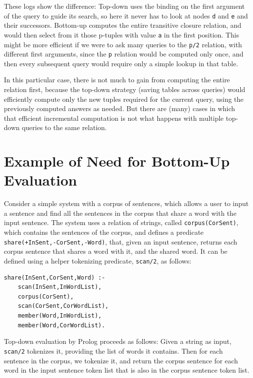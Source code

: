 These logs show the difference: Top-down uses the binding on the first
argument of the query to guide its search, so here it never
has to look at nodes {\tt d} and {\tt e} and their successors.
Bottom-up computes the entire transitive closure relation, and would
then select from it those p-tuples with value {\tt a}
in the first position.  This might be more efficient if we were to ask
many queries to the {\tt p/2} relation, with different first
arguments, since the {\tt p} relation would be computed only once, and
then every subsequent query would require only a simple lookup in that
table.

In this particular case, there is not much to gain from computing the
entire relation first, because the top-down strategy (saving tables
across queries) would efficiently compute only the new tuples required
for the current query, using the previously computed answers as
needed.  But there are (many) cases in which that efficient
incremental computation is not what happens with multiple top-down
queries to the same relation.

\section{Example of Need for Bottom-Up Evaluation}

\begin{example} \label{corpus}
Consider a simple system with a corpus of sentences,
which allows a user to input a sentence and find all the sentences in
the corpus that share a word with the input sentence.  The system uses
a relation of strings, called {\tt corpus(CorSent)}, which contains
the sentences of the corpus, and defines a predicate {\tt
  share(+InSent,-CorSent,-Word)}, that, given an input sentence,
returns each corpus sentence that shares a word with it, and the shared
word.  It can be defined using a helper tokenizing
predicate, {\tt scan/2}, as follows:

\footnotesize
\begin{verbatim}
share(InSent,CorSent,Word) :-
    scan(InSent,InWordList),
    corpus(CorSent),
    scan(CorSent,CorWordList),
    member(Word,InWordList),
    member(Word,CorWordList).
\end{verbatim}
\normalsize

Top-down evaluation by Prolog proceeds as follows:
Given a string as input, {\tt scan/2} tokenizes it,
providing the list of words it contains.  Then for each sentence in
the corpus, we tokenize it, and return the corpus sentence for
each word in the input sentence token list that is also in the corpus
sentence token list.
\end{example}

